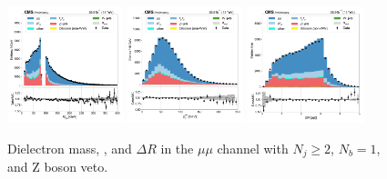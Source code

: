 \begin{figure}[htb!]
    \centering
    \includegraphics[width=0.3\textwidth]{chapters/Analysis/sectionPlots/figures/data_mc_overlays/mumu_2016_cat_gt2_eq1_b_signal_linear_lepton_dilepton1_mass}
    \includegraphics[width=0.3\textwidth]{chapters/Analysis/sectionPlots/figures/data_mc_overlays/mumu_2016_cat_gt2_eq1_b_signal_linear_lepton_dilepton1_pt}
    \includegraphics[width=0.3\textwidth]{chapters/Analysis/sectionPlots/figures/data_mc_overlays/mumu_2016_cat_gt2_eq1_b_signal_linear_lepton_dilepton1_delta_r}
    \caption{Dielectron mass, \pt, and $\Delta R$ in the $\mu\mu$ channel
    with $N_{j} \geq 2$, $N_{b} = 1$, and Z boson veto.}
    \label{fig:analysis:plots:mumu_1_dilepton}
\end{figure}

